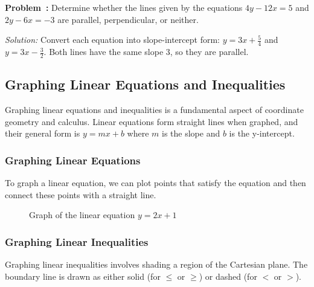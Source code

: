 \documentclass[a4paper,12pt]{book}
\newcounter{problem}
\newenvironment{problem}[1][\theproblem]
{\refstepcounter{problem}\par\medskip\noindent\textbf{Problem~#1:} \rmfamily}{\medskip}
\newenvironment{solution}[1][]
{\par\noindent\textit{Solution:} \rmfamily}{\medskip}
\begin{document}
\begin{problem}
Determine whether the lines given by the equations \( 4y - 12x = 5 \) and \( 2y - 6x = -3 \) are parallel, perpendicular, or neither.
\end{problem}

\begin{solution}
Convert each equation into slope-intercept form: \( y = 3x + \frac{5}{4} \) and \( y = 3x - \frac{3}{2} \). Both lines have the same slope \( 3 \), so they are parallel.
\end{solution}




\subsection{Graphing Linear Equations and Inequalities}
\label{subsec:graphing_linear_equations}
Graphing linear equations and inequalities is a fundamental aspect of coordinate geometry and calculus. Linear equations form straight lines when graphed, and their general form is \( y = mx + b \) where \( m \) is the slope and \( b \) is the y-intercept.

\subsubsection{Graphing Linear Equations}
\label{subsubsec:graphing_linear_equations}
To graph a linear equation, we can plot points that satisfy the equation and then connect these points with a straight line.

\begin{figure}[H]
\centering
{}
\caption{Graph of the linear equation \(y = 2x + 1\)}
\end{figure}

\subsubsection{Graphing Linear Inequalities}
\label{subsubsec:graphing_linear_inequalities}
Graphing linear inequalities involves shading a region of the Cartesian plane. The boundary line is drawn as either solid (for \(\leq\) or \(\geq\)) or dashed (for \(<\) or \(>\)).
\end{document}
